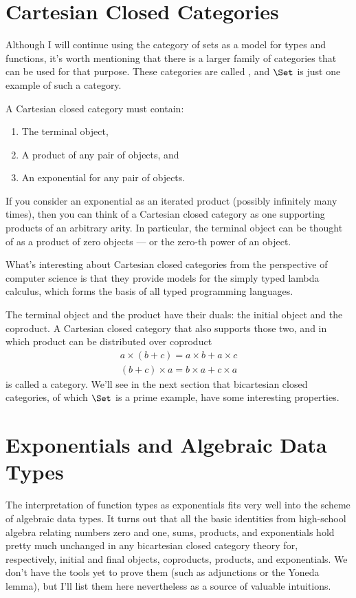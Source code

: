 \section{Cartesian Closed Categories}

Although I will continue using the category of sets as a model for types
and functions, it's worth mentioning that there is a larger family of
categories that can be used for that purpose. These categories are
called , and $\Set$ is just one example of
such a category.

A Cartesian closed category must contain:

\begin{enumerate}
\tightlist
\item
  The terminal object,
\item
  A product of any pair of objects, and
\item
  An exponential for any pair of objects.
\end{enumerate}
If you consider an exponential as an iterated product (possibly
infinitely many times), then you can think of a Cartesian closed
category as one supporting products of an arbitrary arity. In
particular, the terminal object can be thought of as a product of zero
objects --- or the zero-th power of an object.

What's interesting about Cartesian closed categories from the
perspective of computer science is that they provide models for the
simply typed lambda calculus, which forms the basis of all typed
programming languages.

The terminal object and the product have their duals: the initial object
and the coproduct. A Cartesian closed category that also supports those
two, and in which product can be distributed over coproduct
\begin{gather*}
a \times (b + c) = a \times b + a \times c \\
(b + c) \times a = b \times a + c \times a
\end{gather*}
is called a  category. We'll see in the next
section that bicartesian closed categories, of which $\Set$ is a
prime example, have some interesting properties.

\section{Exponentials and Algebraic Data Types}

The interpretation of function types as exponentials fits very well into
the scheme of algebraic data types. It turns out that all the basic
identities from high-school algebra relating numbers zero and one, sums,
products, and exponentials hold pretty much unchanged in any bicartesian
closed category theory for, respectively, initial and final objects,
coproducts, products, and exponentials. We don't have the tools yet to
prove them (such as adjunctions or the Yoneda lemma), but I'll list them
here nevertheless as a source of valuable intuitions.

